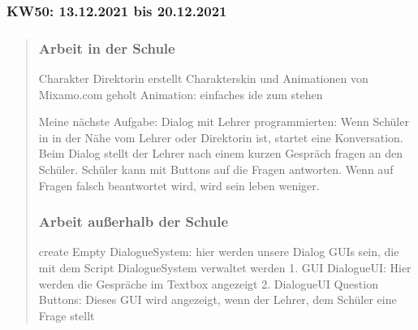 
\subsubsection{KW50: 13.12.2021 bis 20.12.2021}
\begin{quote}
	\subsubsection*{Arbeit in der Schule}
	Charakter Direktorin erstellt
	Charakterskin und Animationen von Mixamo.com geholt
	Animation: einfaches ide zum stehen
	
	
	Meine nächste Aufgabe:
	Dialog mit Lehrer programmierten: Wenn Schüler in in der Nähe vom Lehrer oder Direktorin ist, startet eine Konversation. 
	Beim Dialog stellt der Lehrer nach einem kurzen Gespräch fragen an den Schüler.
	Schüler kann mit Buttons auf die Fragen antworten.
	Wenn auf Fragen falsch beantwortet wird, wird sein leben weniger.
	\subsubsection*{Arbeit außerhalb der Schule}
	
	create Empty DialogueSystem: hier werden unsere Dialog GUIs sein, die mit dem Script DialogueSystem verwaltet werden
	1. GUI DialogueUI: Hier werden die Gespräche im Textbox angezeigt
	2. DialogueUI Question Buttons: Dieses GUI wird angezeigt, wenn der Lehrer, dem Schüler eine Frage stellt


\end{quote}
